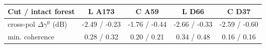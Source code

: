 \begin{tabular}{lcccc}
\toprule
Cut / intact forest & L A173 & C A59 & L D66 & C D37 \\
\midrule
cross-pol $\Delta\gamma^0$ (dB) & -2.49 / -0.23 & -1.76 / -0.44 & -2.66 / -0.33 & -2.59 / -0.60 \\
min. coherence & 0.28 / 0.32 & 0.20 / 0.21 & 0.34 / 0.48 & 0.16 / 0.16 \\
\bottomrule
\end{tabular}
